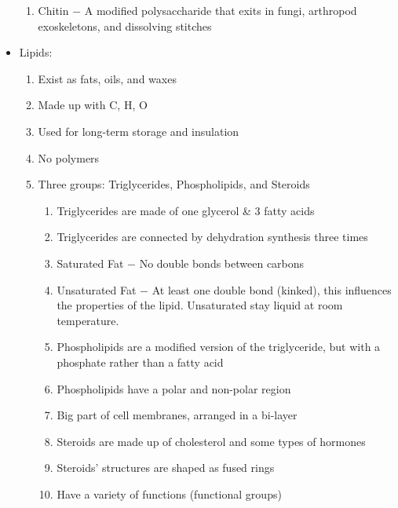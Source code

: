 \documentclass[12pt]{article}
\begin{document}
\begin{itemize}
\begin{enumerate}
      \item Chitin $-$ A modified polysaccharide that exits in fungi, arthropod exoskeletons, and dissolving stitches

    \end{enumerate}

  \item Lipids:

    \begin{enumerate}

      \item Exist as fats, oils, and waxes

      \item Made up with C, H, O

      \item Used for long-term storage and insulation

      \item No polymers

      \item Three groups: Triglycerides, Phospholipids, and Steroids
        
        \begin{enumerate}

          \item Triglycerides are made of one glycerol \& 3 fatty acids

          \item Triglycerides are connected by dehydration synthesis three times

          \item Saturated Fat $-$ No double bonds between carbons

          \item Unsaturated Fat $-$ At least one double bond (kinked), this influences the properties of the lipid. Unsaturated stay liquid at room temperature.

          \item Phospholipids are a modified version of the triglyceride, but with a phosphate rather than a fatty acid

          \item Phospholipids have a polar and non-polar region

          \item Big part of cell membranes, arranged in a bi-layer

          \item Steroids are made up of cholesterol and some types of hormones

          \item Steroids' structures are shaped as fused rings

          \item Have a variety of functions (functional groups)

        \end{enumerate}

    \end{enumerate}

\end{itemize}
\end{document}
